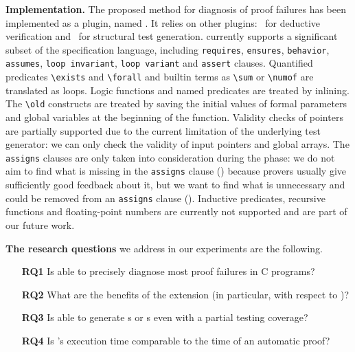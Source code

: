 \textbf{Implementation.}
The proposed method for diagnosis of proof failures 
has been implemented as a \framac plugin, named \stady.
It relies on other plugins: \Wp~\citeframac for deductive
verification and \pathcrawler~\citepathcrawler for structural test generation.
\stady currently supports a significant subset of the \eacsl specification
language, including 
\lstinline'requires', \lstinline'ensures', 
\lstinline'behavior', \lstinline'assumes', 
\lstinline'loop invariant', \lstinline'loop variant' and
\lstinline'assert' clauses.
Quantified predicates
\lstinline[style=c]'\exists' and \lstinline[style=c]'\forall' and builtin terms
as \lstinline'\sum' or \lstinline'\numof' are translated as loops. 
Logic functions and named predicates are treated by inlining.
The \lstinline'\old' constructs are treated by saving the initial
values of formal parameters and global variables at the beginning of the
function. 
Validity checks of pointers are
partially supported due to the current limitation of the underlying test
generator: we can only check the validity of input pointers and global arrays.
The \lstinline'assigns' clauses are only taken into consideration during the
\CWD phase: we do not aim to find what is missing in the \lstinline'assigns'
clause (\NCD) because provers usually give sufficiently good feedback about it,
but we want to find what is unnecessary and could be removed from an
\lstinline'assigns' clause (\CWD).
Inductive predicates, recursive functions and floating-point numbers are
currently not supported and are part of our future work.

\textbf{The research questions} we address in our experiments are the following.

\vspace{-2mm}
\begin{itemize}
\item[\textbf{RQ1}]
Is \stady able to precisely diagnose most proof failures in C programs?
\item[\textbf{RQ2}]
What are the benefits of the \CWD extension (in particular, with respect to
\NCD)?
\item[\textbf{RQ3}]
Is \stady able to generate  \NCCE{}s or \CWCE{}s even with a partial testing coverage?
\item[\textbf{RQ4}]
Is \stady's execution time comparable to the time of an automatic proof?
\end{itemize}
\vspace{-2mm}




